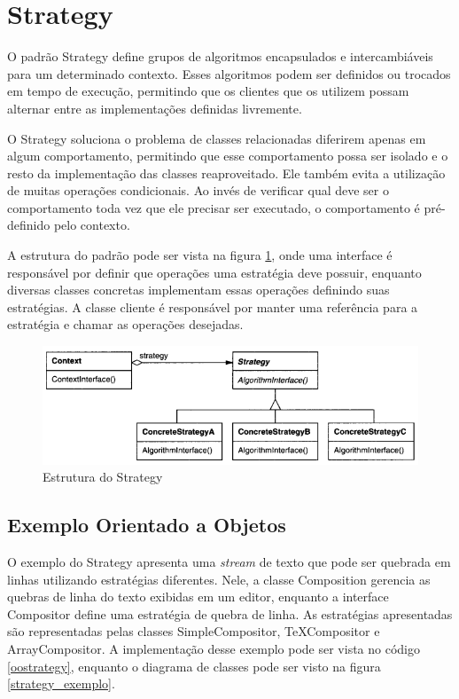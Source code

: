 \section{Strategy}


O padrão Strategy define grupos de algoritmos encapsulados e
intercambiáveis para um determinado contexto. Esses 
algoritmos podem ser definidos ou trocados em tempo de 
execução, permitindo que os clientes que os utilizem possam
alternar entre as implementações definidas livremente.

O Strategy soluciona o problema de classes relacionadas 
diferirem apenas em algum comportamento, permitindo que 
esse comportamento possa ser isolado e o resto da implementação 
das classes reaproveitado. Ele também evita a utilização de 
muitas operações condicionais. Ao invés de verificar qual 
deve ser o comportamento toda vez que ele precisar ser 
executado, o comportamento é pré-definido pelo contexto. 

A estrutura do padrão pode ser vista na figura \ref{strategy_struct}, 
onde uma interface é responsável por definir que operações 
uma estratégia deve possuir, enquanto diversas classes 
concretas implementam essas operações definindo suas 
estratégias. A classe cliente é responsável por manter 
uma referência para a estratégia e chamar as 
operações desejadas.

\begin{figure}[htb]
	\caption{\label{strategy_struct}Estrutura do Strategy}
	\begin{center}
	    \includegraphics[scale=0.5]{5_padroes-contexto-funcional/5.3_comportamentais/5.3.09_strategy/diagram.png}
	\end{center}
\end{figure}

\subsection*{Exemplo Orientado a Objetos}

O exemplo do Strategy apresenta uma \textit{stream} 
de texto que pode ser quebrada em linhas utilizando 
estratégias diferentes. Nele, a classe Composition 
gerencia as quebras de linha do texto exibidas em 
um editor, enquanto a interface Compositor define 
uma estratégia de quebra de linha. As estratégias 
apresentadas são representadas pelas classes 
SimpleCompositor, TeXCompositor e ArrayCompositor. 
A implementação desse exemplo pode ser vista no código 
\ref{oostrategy}, enquanto o diagrama de classes pode 
ser visto na figura \ref{strategy_exemplo}.

